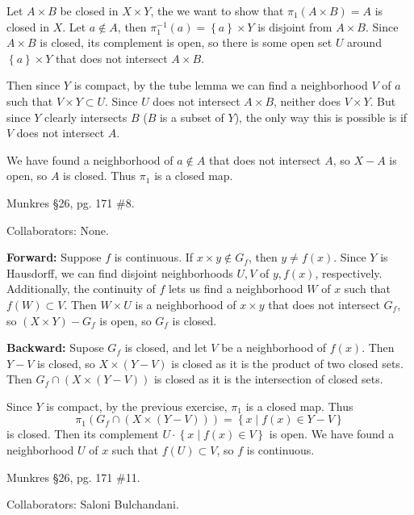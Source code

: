 \documentclass[10pt]{report}
\begin{document}
Let $A \times B$ be closed in $X \times Y$, the we want to show that $\pi_1(A \times B)=A$ is closed in $X$. Let $a \not\in A$, then $\pi_1^{-1}(a) = \left\{ a \right\}\times Y$ is disjoint from $A \times B$. Since $A \times B$ is closed, its complement is open, so there is some open set $U$ around $\left\{ a \right\}\times Y$ that does not intersect $A \times B$.

Then since $Y$ is compact, by the tube lemma we can find a neighborhood $V$ of $a$ such that $V \times Y \subset U$. Since $U$ does not intersect $A \times B$, neither does $V \times Y$. But since $Y$ clearly intersects $B$ ($B$ is a subset of $Y$), the only way this is possible is if $V$ does not intersect $A$.

We have found a neighborhood of $a \not\in A$ that does not intersect $A$, so $X-A$ is open, so $A$ is closed. Thus $\pi_1$ is a closed map.

\begin{exer}[]
Munkres \S 26, pg. 171 \#8.
\end{exer}
{\color{blue}Collaborators: None.}

\textbf{Forward:} Suppose $f$ is continuous. If $x \times y \not\in G_{f}$, then $y \neq f(x)$. Since $Y$ is Hausdorff, we can find disjoint neighborhoods $U, V$ of $y,f(x)$, respectively. Additionally, the continuity of $f$ lets us find a neighborhood $W$ of $x$ such that $f(W) \subset V$. Then $W \times U$ is a neighborhood of $x \times y$ that does not intersect $G_{f}$, so $(X \times Y ) - G_{f}$ is open, so $G_{f}$ is closed.

\textbf{Backward:} Supose $G_f$ is closed, and let $V$ be a neighborhood of $f(x)$. Then $Y-V$ is closed, so $X \times (Y-V)$ is closed as it is the product of two closed sets. Then $G_{f}\cap(X \times (Y-V))$ is closed as it is the intersection of closed sets.

Since $Y$ is compact, by the previous exercise, $\pi_1$ is a closed map. Thus
\[
	\pi_1\left( G_{f}\cap (X \times (Y-V)) \right) = \left\{ x \;|\; f(x) \in Y-V \right\}
\] is closed. Then its complement $U \cdot \left\{ x \;|\; f(x) \in V \right\}$ is open. We have found a neighborhood $U$ of $x$ such that $f(U) \subset V$, so $f$ is continuous.
\pagebreak

\begin{exer}[]
Munkres \S 26, pg. 171 \#11.
\end{exer}
{\color{blue}Collaborators: Saloni Bulchandani.}
\end{document}
